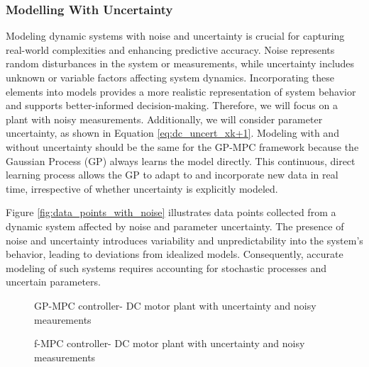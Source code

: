 \subsubsection{Modelling With Uncertainty}
Modeling dynamic systems with noise and uncertainty is crucial for capturing real-world complexities and enhancing predictive accuracy. Noise represents random disturbances in the system or measurements, while uncertainty includes unknown or variable factors affecting system dynamics. Incorporating these elements into models provides a more realistic representation of system behavior and supports better-informed decision-making. Therefore, we will focus on a plant with noisy measurements. Additionally, we will consider parameter uncertainty, as shown in Equation \ref{eq:dc_uncert_xk+1}. Modeling with and without uncertainty should be the same for the GP-MPC framework because the Gaussian Process (GP) always learns the model directly. This continuous, direct learning process allows the GP to adapt to and incorporate new data in real time, irrespective of whether uncertainty is explicitly modeled.




Figure \ref{fig:data_points_with_noise} illustrates data points collected from a dynamic system affected by noise and parameter uncertainty. The presence of noise and uncertainty introduces variability and unpredictability into the system's behavior, leading to deviations from idealized models. Consequently, accurate modeling of such systems requires accounting for stochastic processes and uncertain parameters.


\begin{figure}
    \centering
    
    \caption{GP-MPC controller- DC motor plant with uncertainty and noisy meaurements}
    \label{fig:Gp-mpc_noise_dc}
\end{figure}


\begin{figure}
    \centering
    
    \caption{f-MPC controller- DC motor plant with uncertainty and noisy measurements}
    \label{fig:f-mpc_dc_noise}
\end{figure}

